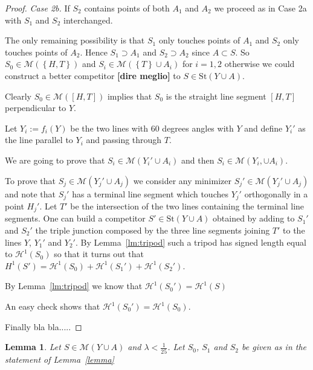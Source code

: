 \documentclass{article}
\renewcommand{\H}{\mathcal H}
\newcommand{\Enclose}[1]{\left[#1\right]}
\newcommand{\ENCLOSE}[1]{\left\{#1\right\}}
\newcommand{\St}{\mathrm{St}}
\newcommand{\M}{\mathcal{M}}
\renewcommand{\H}{\mathcal{H}}
\newtheorem{lemma}[theorem]{Lemma}
\theoremstyle{definition}
\theoremstyle{remark}
\begin{document}
\begin{proof}
\emph{Case 2b.} If $S_2$ contains points of both $A_1$ and $A_2$ we proceed 
as in Case 2a with $S_1$ and $S_2$ interchanged.

The only remaining possibility is that $S_1$ only touches points of $A_1$ 
and $S_2$ only touches points of $A_2$. 
Hence $S_1\supset A_1$ and $S_2\supset A_2$ since $A\subset S$.
So $S_0\in \M(\ENCLOSE{H,T})$  
and $S_i \in \M(\ENCLOSE{T} \cup A_i)$ for $i=1,2$
otherwise we could construct a better competitor \textbf{[dire meglio]} to $S\in \St(Y\cup A)$.

Clearly $S_0\in \M(\Enclose{H,T})$ implies that $S_0$ is the straight 
line segment $[H,T]$ perpendicular to $Y$.

Let $Y_i:=f_i(Y)$ be the two lines with 60 degrees angles
with $Y$ and define $Y_i'$ as the line 
parallel to $Y_i$ and passing through $T$.

We are going to prove that $S_i\in \M(Y_i'\cup A_i)$ 
and then $S_i\in \M(Y_i,\cup A_i)$.

To prove that $S_j\in \M(Y_j'\cup A_j)$ we consider 
any minimizer $S_j' \in \M(Y_j'\cup A_j)$ 
and note that $S_j'$ has a terminal line segment
which touches $Y_j'$ orthogonally 
in a point $H_j'$. 
Let $T'$ be the intersection of the two lines 
containing the terminal line segments.
One can build a competitor $S'\in \St(Y\cup A)$
obtained by adding to $S_1'$ and $S_2'$ the triple 
junction composed by the three line segments joining 
$T'$ to the lines $Y$, $Y_1'$ and $Y_2'$.
By Lemma~\ref{lm:tripod} such a tripod 
has signed length equal to $\H^1(S_0)$
so that it turns out that 
$H^1(S') = \H^1(S_0) + \H^1(S_1') + \H^1(S_2')$.

By Lemma~\ref{lm:tripod} we know that 
$\H^1(S_0') = \H^1(S)$


An easy check shows that $\H^1(S_0') = \H^1(S_0)$.

Finally bla bla.....
\end{proof}

\begin{lemma}
  Let $S\in \M(Y\cup A)$ and $\lambda<\frac 1 {25}$.
  Let $S_0$, $S_1$ and $S_2$ be given as in the statement 
  of Lemma~\ref{lemma}
  
\end{lemma}
\end{document}
